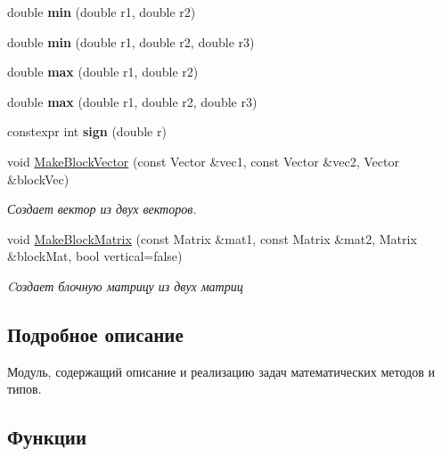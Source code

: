 \begin{DoxyCompactItemize}
\item 
double {\bfseries min} (double r1, double r2)\hypertarget{namespace_math_ae26b2810c63a7371c5ddcb2d6b8eee5f}{}\label{namespace_math_ae26b2810c63a7371c5ddcb2d6b8eee5f}

\item 
double {\bfseries min} (double r1, double r2, double r3)\hypertarget{namespace_math_af61c28c934487ea81975c12b964fb6fd}{}\label{namespace_math_af61c28c934487ea81975c12b964fb6fd}

\item 
double {\bfseries max} (double r1, double r2)\hypertarget{namespace_math_a3727fcec816696b6f7c7f96856eaceb5}{}\label{namespace_math_a3727fcec816696b6f7c7f96856eaceb5}

\item 
double {\bfseries max} (double r1, double r2, double r3)\hypertarget{namespace_math_ade03f4c828f4387e57d2022b9ac77baf}{}\label{namespace_math_ade03f4c828f4387e57d2022b9ac77baf}

\item 
constexpr int {\bfseries sign} (double r)\hypertarget{namespace_math_a4650857e985bad2d24c465ca82636ed9}{}\label{namespace_math_a4650857e985bad2d24c465ca82636ed9}

\item 
void \hyperlink{namespace_math_a0b4a2119a9abdbfe7902e57a22e6405e}{Make\+Block\+Vector} (const Vector \&vec1, const Vector \&vec2, Vector \&block\+Vec)
\begin{DoxyCompactList}\small\item\em Создает вектор из двух векторов. \end{DoxyCompactList}\item 
void \hyperlink{namespace_math_ae35cd48733558c989154be3201e754ab}{Make\+Block\+Matrix} (const Matrix \&mat1, const Matrix \&mat2, Matrix \&block\+Mat, bool vertical=false)
\begin{DoxyCompactList}\small\item\em Cоздает блочную матрицу из двух матриц \end{DoxyCompactList}\end{DoxyCompactItemize}


\subsection{Подробное описание}
Модуль, содержащий описание и реализацию задач математических методов и типов. 

\subsection{Функции}

